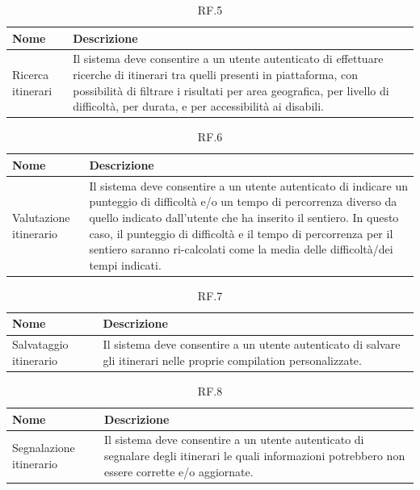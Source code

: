 \documentclass{natourDoc}
\begin{document}
	\begin{table}[H]
		\centering
		\begin{tabular}{ |p{5cm}|p{10.3cm}| } 
			\hline
			\rowcolor{PineGreen!70}
			\textbf{Nome} & \textbf{Descrizione} \\
			\hline
			Ricerca itinerari &  Il sistema deve consentire a un utente autenticato di effettuare ricerche di itinerari tra quelli presenti in piattaforma, con possibilità di filtrare i risultati
			per area geografica, per livello di difficoltà, per durata, e per accessibilità ai disabili.\\ 
			\hline
		\end{tabular}
		\caption{RF.5}
		\label{table:5}
	\end{table}
	
	\begin{table}[H]
		\centering
		\begin{tabular}{ |p{5cm}|p{10.3cm}| } 
			\hline
			\rowcolor{PineGreen!70}
			\textbf{Nome} & \textbf{Descrizione} \\
			\hline
			Valutazione itinerario & Il sistema deve consentire a un utente autenticato di indicare un punteggio di difficoltà e/o un tempo
			di percorrenza diverso da quello indicato dall’utente che ha inserito il sentiero. In questo caso, il
			punteggio di difficoltà e il tempo di percorrenza per il sentiero saranno ri-calcolati come la media
			delle difficoltà/dei tempi indicati.\\ 
			\hline
		\end{tabular}
		\caption{RF.6}
		\label{table:6}
	\end{table}
	
	\begin{table}[H]
		\centering
		\begin{tabular}{ |p{5cm}|p{10.3cm}| }
			\hline
			\rowcolor{PineGreen!70}
			\textbf{Nome} & \textbf{Descrizione} \\
			\hline
			Salvataggio itinerario & Il sistema deve consentire a un utente autenticato di salvare gli itinerari
			nelle proprie compilation personalizzate. \\
			\hline
		\end{tabular}
		\caption{RF.7}
		\label{table:7}
	\end{table}

	\begin{table}[H]
		\centering
		\begin{tabular}{ |p{5cm}|p{10.3cm}| }
			\hline
			\rowcolor{PineGreen!70}
			\textbf{Nome} & \textbf{Descrizione} \\
			\hline
			Segnalazione itinerario & Il sistema deve consentire a un utente autenticato di segnalare degli itinerari
			le quali informazioni potrebbero non essere corrette e/o aggiornate. \\
			\hline
		\end{tabular}
		\caption{RF.8}
		\label{table:8}
	\end{table}
\end{document}

